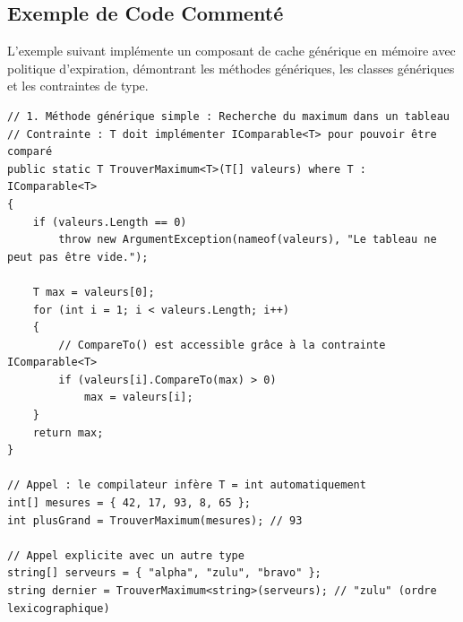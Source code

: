 \subsection{Exemple de Code Commenté}

L'exemple suivant implémente un composant de cache générique en mémoire avec politique d'expiration, démontrant les méthodes génériques, les classes génériques et les contraintes de type.

\begin{lstlisting}[caption={Méthode générique et classe générique avec contraintes}]
// 1. Méthode générique simple : Recherche du maximum dans un tableau
// Contrainte : T doit implémenter IComparable<T> pour pouvoir être comparé
public static T TrouverMaximum<T>(T[] valeurs) where T : IComparable<T>
{
    if (valeurs.Length == 0)
        throw new ArgumentException(nameof(valeurs), "Le tableau ne peut pas être vide.");

    T max = valeurs[0];
    for (int i = 1; i < valeurs.Length; i++)
    {
        // CompareTo() est accessible grâce à la contrainte IComparable<T>
        if (valeurs[i].CompareTo(max) > 0)
            max = valeurs[i];
    }
    return max;
}

// Appel : le compilateur infère T = int automatiquement
int[] mesures = { 42, 17, 93, 8, 65 };
int plusGrand = TrouverMaximum(mesures); // 93

// Appel explicite avec un autre type
string[] serveurs = { "alpha", "zulu", "bravo" };
string dernier = TrouverMaximum<string>(serveurs); // "zulu" (ordre lexicographique)
\end{lstlisting}

